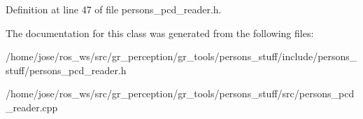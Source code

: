 Definition at line 47 of file persons\+\_\+pcd\+\_\+reader.\+h.



The documentation for this class was generated from the following files\+:\begin{DoxyCompactItemize}
\item 
/home/jose/ros\+\_\+ws/src/gr\+\_\+perception/gr\+\_\+tools/persons\+\_\+stuff/include/persons\+\_\+stuff/persons\+\_\+pcd\+\_\+reader.\+h\item 
/home/jose/ros\+\_\+ws/src/gr\+\_\+perception/gr\+\_\+tools/persons\+\_\+stuff/src/persons\+\_\+pcd\+\_\+reader.\+cpp\end{DoxyCompactItemize}
